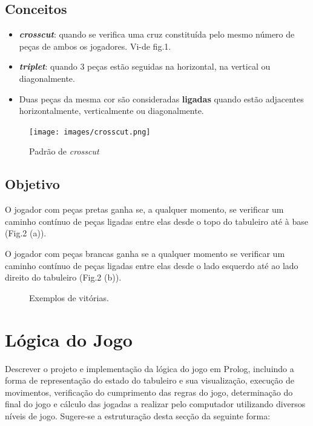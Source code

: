 \documentclass[a4paper]{article}
\begin{document}
\subsection*{Conceitos}
\begin{itemize}
\item \textit{\textbf{crosscut}}: quando se verifica uma cruz constituída pelo mesmo número de peças de ambos os jogadores. Vi-de fig.1.
\item \textit{\textbf{triplet}}: quando 3 peças estão seguidas na horizontal, na vertical ou diagonalmente.
\item Duas peças da mesma cor são consideradas \textbf{ligadas} quando estão adjacentes horizontalmente, verticalmente ou diagonalmente.
\end{itemize}
\begin{figure}[H]
	\centering
	\texttt{[image: images/crosscut.png]}
	\caption{Padrão de \textit{crosscut}}
	\label{fig:crosscut}
\end{figure}
\subsection*{Objetivo}

O jogador com peças pretas ganha se, a qualquer momento, se verificar um caminho contínuo de peças ligadas entre elas desde o topo do tabuleiro até à base (Fig.2 (a)).
\par
O jogador com peças brancas ganha se a qualquer momento se verificar um caminho contínuo de peças ligadas entre elas desde o lado esquerdo até ao lado direito do tabuleiro (Fig.2 (b)).

\begin{figure}[H]
	\centering
	\hfill
	\caption{Exemplos de vitórias.}
\end{figure}

\section{Lógica do Jogo}

Descrever o projeto e implementação da lógica do jogo em Prolog, incluindo a forma de representação do estado do tabuleiro e sua visualização, execução de movimentos, verificação do cumprimento das regras do jogo, determinação do final do jogo e cálculo das jogadas a realizar pelo computador utilizando diversos níveis de jogo. Sugere-se a estruturação desta secção da seguinte forma:
\end{document}
